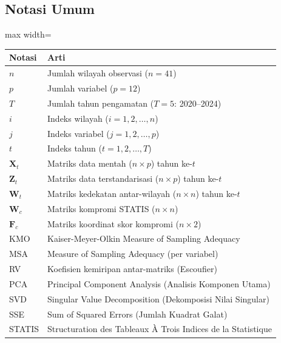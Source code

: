 \documentclass[11pt,a4paper]{article}
\begin{document}
\subsection*{Notasi Umum}
\begin{adjustbox}{max width=\textwidth}
\begin{tabular}{ll}
\toprule
\textbf{Notasi} & \textbf{Arti} \\
\midrule
$n$ & Jumlah wilayah observasi ($n = 41$) \\
$p$ & Jumlah variabel ($p = 12$) \\
$T$ & Jumlah tahun pengamatan ($T = 5$: 2020--2024) \\
$i$ & Indeks wilayah ($i = 1, 2, \ldots, n$) \\
$j$ & Indeks variabel ($j = 1, 2, \ldots, p$) \\
$t$ & Indeks tahun ($t = 1, 2, \ldots, T$) \\
$\mathbf{X}_t$ & Matriks data mentah ($n \times p$) tahun ke-$t$ \\
$\mathbf{Z}_t$ & Matriks data terstandarisasi ($n \times p$) tahun ke-$t$ \\
$\mathbf{W}_t$ & Matriks kedekatan antar-wilayah ($n \times n$) tahun ke-$t$ \\
$\mathbf{W}_c$ & Matriks kompromi STATIS ($n \times n$) \\
$\mathbf{F}_c$ & Matriks koordinat skor kompromi ($n \times 2$) \\
KMO & Kaiser-Meyer-Olkin Measure of Sampling Adequacy \\
MSA & Measure of Sampling Adequacy (per variabel) \\
RV & Koefisien kemiripan antar-matriks (Escoufier) \\
PCA & Principal Component Analysis (Analisis Komponen Utama) \\
SVD & Singular Value Decomposition (Dekomposisi Nilai Singular) \\
SSE & Sum of Squared Errors (Jumlah Kuadrat Galat) \\
STATIS & Structuration des Tableaux \`A Trois Indices de la Statistique \\
\bottomrule
\end{tabular}
\end{adjustbox}

\newpage
\end{document}
